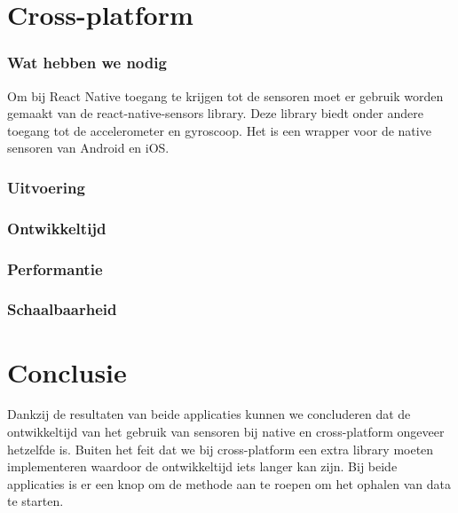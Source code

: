 


\section{Cross-platform}
\subsubsection{Wat hebben we nodig}
Om bij React Native toegang te krijgen tot de sensoren moet er gebruik worden gemaakt van de react-native-sensors library.
Deze library biedt onder andere toegang tot de accelerometer en gyroscoop. Het is een wrapper voor de
native sensoren van Android en iOS. 

\subsubsection{Uitvoering}



\subsubsection{Ontwikkeltijd}



\subsubsection{Performantie}



\subsubsection{Schaalbaarheid}




\section{Conclusie}
Dankzij de resultaten van beide applicaties kunnen we concluderen dat de ontwikkeltijd van het gebruik van sensoren
bij native en cross-platform ongeveer hetzelfde is. Buiten het feit dat we bij cross-platform een extra library moeten
implementeren waardoor de ontwikkeltijd iets langer kan zijn. Bij beide applicaties is er een knop om de methode aan 
te roepen om het ophalen van data te starten.

